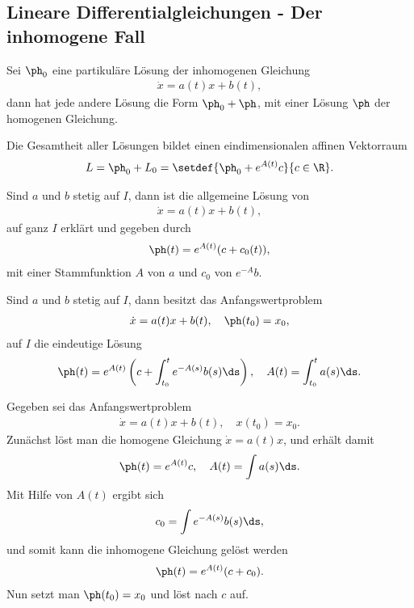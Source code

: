 \subsection{Lineare Differentialgleichungen - Der inhomogene Fall}
\begin{prop}
Sei $\ph_0$ eine partikuläre Lösung der inhomogenen Gleichung
\begin{align*}
\dot{x} = a(t)x + b(t),
\end{align*}
dann hat jede andere Lösung die Form $\ph_0 + \ph$, mit einer Lösung $\ph$ der
homogenen Gleichung.
\end{prop}
\begin{prop}
Die Gesamtheit aller Lösungen bildet einen eindimensionalen affinen Vektorraum
\begin{align*}
L = \ph_0 + L_0 = \setdef{\ph_0 + e^{A(t)}c}{c\in\R}.
\end{align*}
\end{prop}
\begin{prop}
Sind $a$ und $b$ stetig auf $I$, dann ist die allgemeine Lösung von
\begin{align*}
\dot{x} = a(t)x + b(t),
\end{align*}
auf ganz $I$ erklärt und gegeben durch
\begin{align*}
\ph(t) = e^{A(t)}(c+c_0(t)),
\end{align*}
mit einer Stammfunktion $A$ von $a$ und $c_0$ von $e^{-A}b$.
\end{prop}
\begin{prop}
Sind $a$ und $b$ stetig auf $I$, dann besitzt das Anfangswertproblem
\begin{align*}
\dot{x} = a(t)x + b(t),\quad \ph(t_0) = x_0,
\end{align*}
auf $I$ die eindeutige Lösung
\begin{align*}
\ph(t) = e^{A(t)}\left(c + \int_{t_0}^t e^{-A(s)}b(s)\ds \right), \quad
 A(t) = \int_{t_0}^t a(s)\ds.
\end{align*}
\end{prop}

\begin{prop}[Prozedur]
Gegeben sei das Anfangswertproblem
\begin{align*}
\dot{x} = a(t)x + b(t), \quad x(t_0) = x_0.
\end{align*}
Zunächst löst man die homogene Gleichung $\dot{x} = a(t)x$, und erhält damit
\begin{align*}
\ph(t) = e^{A(t)}c,\quad A(t) = \int a(s)\ds.
\end{align*}
Mit Hilfe von $A(t)$ ergibt sich
\begin{align*}
c_0 = \int e^{-A(s)}b(s)\ds,
\end{align*}
und somit kann die inhomogene Gleichung gelöst werden
\begin{align*}
\ph(t) = e^{A(t)}(c + c_0).
\end{align*}
Nun setzt man $\ph(t_0) = x_0$ und löst nach $c$ auf.
\end{prop}

